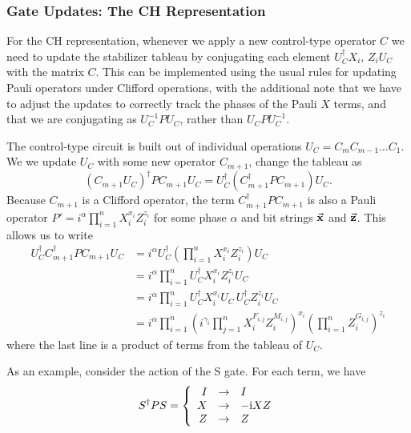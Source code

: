 \subsubsection*{Gate Updates: The CH Representation}
For the CH representation, whenever we apply a new control-type operator $C$ we need to update the stabilizer tableau by conjugating each element $U_{C}^{\dagger}X_{i},\,Z_{i}U_{C}$ with the matrix $C$. This can be implemented using the usual rules for updating Pauli operators under Clifford operations, with the additional note that we have to adjust the updates to correctly track the phases of the Pauli $X$ terms, and that we are conjugating as $U_{C}^{-1}PU_{C}$, rather than $U_{C}PU_{C}^{-1}$. \par
The control-type circuit is built out of individual operations $U_{C}=C_{m}C_{m-1}\dots C_{1}$. We we update $U_{C}$ with some new operator $C_{m+1}$, change the tableau as
\begin{equation}
\left(C_{m+1}U_{C}\right)^{\dagger} P C_{m+1}U_{C} = U_{C}^{\dagger} \left(C_{m+1}^{\dagger}PC_{m+1}\right)U_{C}.
\end{equation}
Because $C_{m+1}$ is a Clifford operator, the term $C^{\dagger}_{m+1}PC_{m+1}$ is also a Pauli operator $P'=i^{\alpha}\prod_{i=1}^{n}X_{i}^{x_{i}}Z_{i}^{z_{i}}$ for some phase $\alpha$ and bit strings $\va{x}$ and $\va{z}$. This allows us to write
\begin{align}
U_{C}^{\dagger} C_{m+1}^{\dagger}PC_{m+1} U_{C} &= i^{\alpha} U_{C}^{\dagger}\left(\prod_{i=1}^{n}X_{i}^{x_{i}}Z_{i}^{z_{i}}\right)U_{C} \nonumber \\
&= i^{\alpha} \prod_{i=1}^{n} U_{C}^{\dagger} X_{i}^{x_{i}} Z_{i}^{z_{i}}U_{C} \nonumber \\
&= i^{\alpha} \prod_{i=1}^{n}U_{C}^{\dagger} X_{i}^{x_{i}}U_{C}\,U_{C}^{\dagger}Z_{i}^{z_{i}}U_{C} \nonumber \\
&= i^{\alpha} \prod_{i=1}^{n}\left(i^{\gamma_{i}} \prod_{j=1}^{n}X_{i}^{F_{i,j}}Z_{i}^{M_{i,j}}\right)^{x_{i}}\left(\prod_{i=1}^{n}Z_{i}^{G_{i,j}}\right)^{z_{i}}
\label{eq:expanded_leftupdate}
\end{align}
where the last line is a product of terms from the tableau of $U_{C}$.\par
As an example, consider the action of the S gate. For each term, we have
\[
S^{\dagger}PS =  \left\{ \begin{array}{rcl}
    I & \rightarrow & I \\
    X & \rightarrow & -\mathrm{i} XZ \\
    Z & \rightarrow & Z \\
    \end{array}\right.
\]

